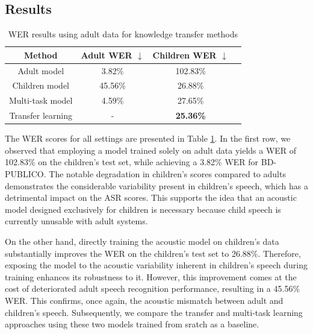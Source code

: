 \subsection{Results}
\begin{table}[h]
\centering
\begin{tabular}{c|ccc}
\hline
 Method & Adult WER $\downarrow$   & Children WER  $\downarrow$   \\ \hline
\multicolumn{1}{c|}{Adult model} & 3.82\%   &  102.83\%\\ 
\multicolumn{1}{c|}{Children model} & 45.56\%  & 26.88\% \\ 
\multicolumn{1}{c|}{Multi-task model}  &   4.59\% &  27.65\% \\ 
\multicolumn{1}{c|}{Transfer learning} &  -  & \textbf{25.36\%} \\ \hline


\end{tabular}

\caption{WER results using adult data for knowledge transfer methods}
\label{tab:res_exp1}
\end{table}

The \ac{WER} scores for all settings are presented in Table \ref{tab:res_exp1}. In the first row, we observed that employing a model trained solely on adult data yields a \ac{WER} of 102.83\% on the children's test set, while achieving a 3.82\% \ac{WER} for BD-PUBLICO. The notable degradation in children's scores compared to adults demonstrates the considerable variability present in children's speech, which has a detrimental impact on the \ac{ASR} scores. This supports the idea that an acoustic model designed exclusively for children is necessary because child speech is currently unusable with adult systems.

On the other hand, directly training the acoustic model on children's data substantially improves the \ac{WER} on the children's test set to 26.88\%. Therefore, exposing the model to the acoustic variability inherent in children's speech during training enhances its robustness to it. However, this improvement comes at the cost of deteriorated adult speech recognition performance, resulting in a 45.56\% \ac{WER}. This confirms, once again, the acoustic mismatch between adult and children's speech. Subsequently, we compare the transfer and multi-task learning approaches using these two models trained from sratch as a baseline.


